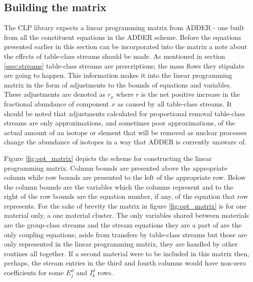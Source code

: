 \documentclass[]{elsarticle}
\begin{document}
\subsection{Building the matrix}
The CLP library expects a linear programming matrix from ADDER - one built from
all the constituent equations in the ADDER scheme. Before the equations 
presented earlier in this section can be incorporated into the matrix a note
about the effects of table-class streams should be made. As mentioned in section
\ref{ssec:streams} table-class streams are prescriptions; the mass flows they
stipulate are going to happen. This information makes it into the linear
programming matrix in the form of adjustments to the bounds of equations
and variables. These adjustments are denoted
as $r_{x}$ where $r$ is the net positive increase in the fractional abundance of
component $x$ as caused by all table-class streams. It should be noted that
adjustments calculated for proportional removal table-class streams are only
approximations, and sometimes poor approximations, of the actual amount of an
isotope or element that will be removed as nuclear processes change the 
abundance of isotopes in a way that ADDER is currently unaware of.

Figure \ref{fig:opt_matrix}
depicts the scheme for constructing the linear programming matrix. Column bounds
are presented above the appropriate column while row bounds are presented to the
left of the appropriate row. Below the column bounds are the variables which
the columns represent and to the right of the row bounds are the equation
number, if any, of the equation that row represents. For the sake of brevity
the matrix in figure \ref{fig:opt_matrix} is for one material only, a one 
material cluster. The only variables shared between materials are the
group-class streams and the stream equations they are a part of are the only
coupling equations; aside from transfers by table-class streams but those
are only represented in the linear programming matrix, they are handled by
other routines all together. If a second material were to be included in this
matrix then, perhaps, the stream entries in the third and fourth columns would
have non-zero coefficients for some $E_{j}^{d}$ and $I_{k}^{d}$ rows.
\end{document}
